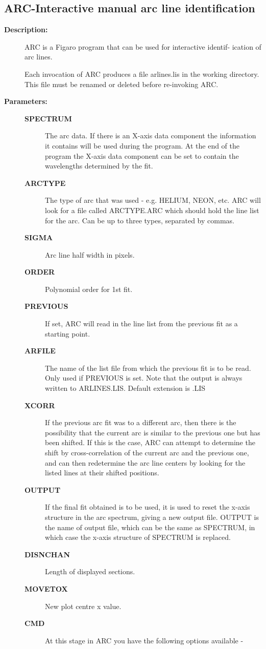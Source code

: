 \subsection{ARC-\label{ARC}Interactive manual arc line identification}
\begin{description}

\item [\textbf{Description:}]
 ARC is a Figaro program that can be used for interactive identif-
 ication of arc lines.

 Each invocation of ARC produces a file arlines.lis in the working
 directory.  This file must be renamed or deleted before re-invoking
 ARC.

\item [\textbf{Parameters:}]
\begin{description}
\item [\textbf{SPECTRUM}]
 The arc data. If there is an X-axis data component the information it
 contains will be used during the program.  At the end of the program
 the X-axis data component can be set to contain the wavelengths
 determined by the fit.
\item [\textbf{ARCTYPE}]
 The type of arc that was used - e.g. HELIUM, NEON, etc.  ARC will look
 for a file called ARCTYPE.ARC which should hold the line list for the
 arc.  Can be up to three types, separated by commas.
\item [\textbf{SIGMA}]
 Arc line half width in pixels.
\item [\textbf{ORDER}]
 Polynomial order for 1st fit.
\item [\textbf{PREVIOUS}]
 If set, ARC will read in the line list from the previous fit as
 a starting point.
\item [\textbf{ARFILE}]
 The name of the list file from which the previous fit is to be read.
 Only used if PREVIOUS is set.  Note that the output is always
 written to ARLINES.LIS.  Default extension is .LIS
\item [\textbf{XCORR}]
 If the previous arc fit was to a different arc, then there is the
 possibility that the current arc is similar to the previous one but
 has been shifted. If this is the case, ARC can attempt to determine
 the shift by cross-correlation of the current arc and the previous
 one, and can then redetermine the arc line centers by looking for the
 listed lines at their shifted positions.
\item [\textbf{OUTPUT}]
 If the final fit obtained is to be used, it is used to reset the
 x-axis structure in the arc spectrum, giving a new output file.
 OUTPUT is the name of output file, which can be the same as SPECTRUM,
 in which case the x-axis structure of SPECTRUM is replaced.
\item [\textbf{DISNCHAN}]
 Length of displayed sections.
\item [\textbf{MOVETOX}]
 New plot centre x value.
\item [\textbf{CMD}]
 At this stage in ARC you have the following options available -


\end{description}
\end{description}
